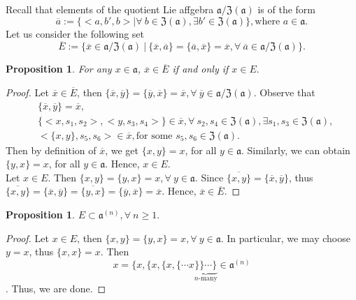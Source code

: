 \documentclass{article}
\newtheorem{proposition}[theorem]{Proposition}
\theoremstyle{definition}
\theoremstyle{remark}
\theoremstyle{plain}
\begin{document}
Recall that elements of the quotient Lie affgebra $\mathfrak{a}/\mathfrak{Z(a)}$ is of the form $$\overline{a}:=\{<a, b', b>|\forall~ b\in \mathfrak{Z(a)}, \exists b'\in \mathfrak{Z(a)}\}, \text{where $a\in \mathfrak{a}$}.$$
Let us consider the following set $$\overline{E}:=\{\overline{x}\in \mathfrak{a}/\mathfrak{Z(a)}~|~ \{\overline{x}, \overline{a}\}=\{\overline{a}, \overline{x}\}=\overline{x}, \forall~ \overline{a}\in \mathfrak{a}/\mathfrak{Z(a)}\}.$$
\begin{proposition}\label{1}
    For any $x\in \mathfrak{a}$, $\overline{x}\in \overline{E}$ if and only if $x\in E.$
\end{proposition}
\begin{proof}
    Let $\overline{x}\in \overline{E}$, then $\{\overline{x}, \overline{y}\}=\{\overline{y}, \overline{x}\}=\overline{x},  \forall~ \overline{y} \in \mathfrak{a}/\mathfrak{Z(a)}$. Observe that
    \begin{align*}
        &\{\overline{x}, \overline{y}\}=\overline{x},\\
        & \{<x, s_1, s_2>, <y, s_3, s_4>\}\in \overline{x}, \forall~ s_2, s_4 \in \mathfrak{Z(a)}, \exists s_1, s_3 \in \mathfrak{Z(a)},\\
        & <\{x, y\}, s_5, s_6> \in \overline{x}, \text{for some $s_5, s_6 \in \mathfrak{Z(a)}.$}
    \end{align*}
    Then by definition of $\overline{x}$, we get $\{x, y\}=x$, for all $y\in \mathfrak{a}$. Similarly, we can obtain $\{y, x\}=x$, for all $y\in\mathfrak{a}.$ Hence, $x\in E$.\\
    Let $x\in E.$ Then $\{x, y\}=\{y, x\}=x, \forall~ y \in \mathfrak{a}$. Since $\overline{\{x, y\}}=\{\overline{x}, \overline{y}\}$, thus $\overline{\{x, y\}}=\{\overline{x}, \overline{y}\}=\overline{\{y, x\}}=\{\overline{y}, \overline{x}\}=\overline{x}.$ Hence, $\overline{x}\in \overline{E}.$
\end{proof}
\begin{proposition}\label{2}
    $E\subset \mathfrak{a}^{(n)}, \forall~ n\geq 1.$
\end{proposition}
\begin{proof}
    Let $x\in E$, then $\{x, y\}=\{y, x\}=x, \forall~ y\in \mathfrak{a}$. In particular, we may choose $y=x$, thus $\{x,x\}=x.$ Then $$x=\{x,\{x,\{x,\{\cdots x\underbrace{ \}\}\cdots \}}_{n\text{-many}}\in \mathfrak{a}^{(n)}$$. Thus, we are done.
\end{proof}
\end{document}
